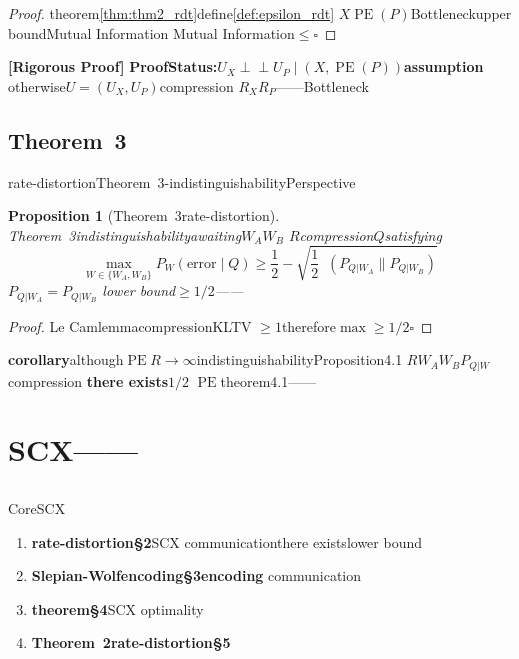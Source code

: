 \documentclass[11pt,a4paper]{article}
\newtheorem{proposition}[theorem]{Proposition}
\theoremstyle{remark}
\DeclareMathOperator{\PE}{PE}
\DeclareMathOperator{\KL}{D_{KL}}
\newcommand{\indep}{\perp\!\!\!\perp}
\newcommand{\rigorous}{\textnormal{\textbf{[Rigorous Proof]}}}
\begin{document}
\begin{proof}
theorem\ref{thm:thm2_rdt}define\ref{def:epsilon_rdt}
$X$$\PE(P)$Bottleneckupper boundMutual Information
Mutual Information$\leq$\hfill $\square$
\end{proof}

\rigorous{} \textbf{ProofStatus:$U_X \indep U_P \mid (X, \PE(P))$assumption}
otherwise$U = (U_X, U_P)$compression
$R_X$$R_P$——Bottleneck

\subsection{Theorem~3}

rate-distortionTheorem~3-indistinguishabilityPerspective

\begin{proposition}[Theorem~3rate-distortion]
\label{prop:thm3_rdt}
Theorem~3indistinguishabilityawaiting$W_A$$W_B$
$R$compression$Q$satisfying
\begin{equation}
    \max_{W \in \{W_A, W_B\}} P_W(\text{error} \mid Q) \geq \frac{1}{2}
    - \sqrt{\frac{1}{2} \KL(P_{Q|W_A} \| P_{Q|W_B})}
\end{equation}
$P_{Q|W_A} = P_{Q|W_B}$
lower bound$\geq 1/2$——
\end{proposition}

\begin{proof}
Le CamlemmacompressionKLTV
$\geq 1$therefore$\max \geq 1/2$\hfill $\square$
\end{proof}

\textbf{corollary}although$\PE$$R \to \infty$indistinguishabilityProposition4.1
$R$$W_A$$W_B$$P_{Q|W}$compression
\textbf{there exists}$1/2$
$\PE$theorem4.1——


\section{SCX——}

\subsection{}

CoreSCX\textbf{}

\begin{enumerate}[label=(\arabic*)]
    \item \textbf{rate-distortion\S2}SCX\textbf{}
          communicationthere existslower bound
    \item \textbf{Slepian-Wolfencoding\S3}\textbf{encoding}
          communication
    \item \textbf{theorem\S4}\textbf{}SCX
          optimality
    \item \textbf{Theorem~2rate-distortion\S5}
          \textbf{}
\end{enumerate}
\end{document}
